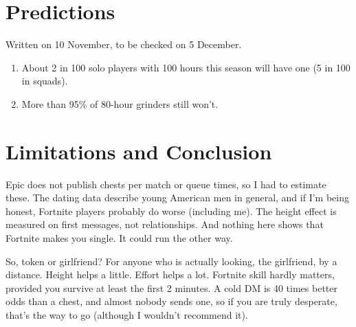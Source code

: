 \documentclass[11pt]{article}
\theoremstyle{definition}
\theoremstyle{plain}
\begin{document}
\section{Predictions}

Written on 10 November, to be checked on 5 December.
\begin{enumerate}[noitemsep,topsep=2pt]
\item About 2 in 100 solo players with 100 hours this season will have one (5 in 100 in squads).
\item More than 95\% of 80-hour grinders still won't.
\end{enumerate}

\section{Limitations and Conclusion}

Epic does not publish chests per match or queue times, so I had to estimate these. The dating data describe young American men in general, and if I'm being honest, Fortnite players probably do worse (including me). The height effect is measured on first messages, not relationships. And nothing here shows that Fortnite makes you single. It could run the other way.

So, token or girlfriend? For anyone who is actually looking, the girlfriend, by a distance. Height helps a little. Effort helps a lot. Fortnite skill hardly matters, provided you survive at least the first 2 minutes. A cold DM is 40 times better odds than a chest, and almost nobody sends one, so if you are truly desperate, that's the way to go (although I wouldn't recommend it).
\end{document}
